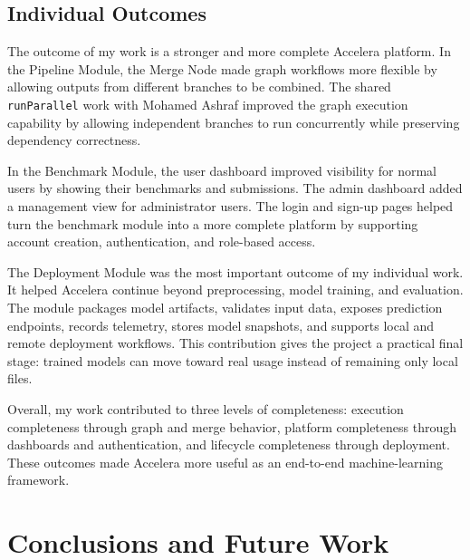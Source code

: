 \documentclass[12pt,a4paper,oneside]{report}
\newcommand{\systemname}{Accelera}
\newcommand{\modulepath}[1]{\texttt{#1}}
\begin{document}
\section{Individual Outcomes}
\noindent The outcome of my work is a stronger and more complete \systemname{} platform. In the Pipeline Module, the Merge Node made graph workflows more flexible by allowing outputs from different branches to be combined. The shared \modulepath{runParallel} work with Mohamed Ashraf improved the graph execution capability by allowing independent branches to run concurrently while preserving dependency correctness.

In the Benchmark Module, the user dashboard improved visibility for normal users by showing their benchmarks and submissions. The admin dashboard added a management view for administrator users. The login and sign-up pages helped turn the benchmark module into a more complete platform by supporting account creation, authentication, and role-based access.

The Deployment Module was the most important outcome of my individual work. It helped \systemname{} continue beyond preprocessing, model training, and evaluation. The module packages model artifacts, validates input data, exposes prediction endpoints, records telemetry, stores model snapshots, and supports local and remote deployment workflows. This contribution gives the project a practical final stage: trained models can move toward real usage instead of remaining only local files.

Overall, my work contributed to three levels of completeness: execution completeness through graph and merge behavior, platform completeness through dashboards and authentication, and lifecycle completeness through deployment. These outcomes made \systemname{} more useful as an end-to-end machine-learning framework.

\chapter{Conclusions and Future Work}
\label{chap:conclusion}
\end{document}
